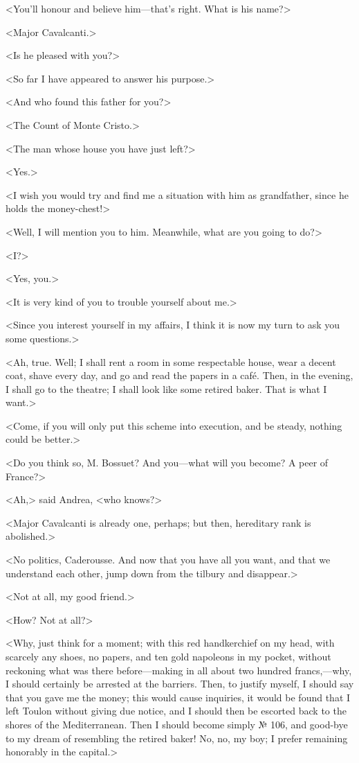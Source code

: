  <You'll honour and believe him—that's right. What is his name?> 

 <Major Cavalcanti.> 

 <Is he pleased with you?> 

 <So far I have appeared to answer his purpose.> 

 <And who found this father for you?> 

 <The Count of Monte Cristo.> 

 <The man whose house you have just left?> 

 <Yes.> 

 <I wish you would try and find me a situation with him as grandfather, since he holds the money-chest!> 

 <Well, I will mention you to him. Meanwhile, what are you going to do?> 

 <I?> 

 <Yes, you.> 

 <It is very kind of you to trouble yourself about me.> 

 <Since you interest yourself in my affairs, I think it is now my turn to ask you some questions.> 

 <Ah, true. Well; I shall rent a room in some respectable house, wear a decent coat, shave every day, and go and read the papers in a café. Then, in the evening, I shall go to the theatre; I shall look like some retired baker. That is what I want.> 

 <Come, if you will only put this scheme into execution, and be steady, nothing could be better.> 

 <Do you think so, M. Bossuet? And you—what will you become? A peer of France?> 

 <Ah,> said Andrea, <who knows?> 

 <Major Cavalcanti is already one, perhaps; but then, hereditary rank is abolished.> 

 <No politics, Caderousse. And now that you have all you want, and that we understand each other, jump down from the tilbury and disappear.> 

 <Not at all, my good friend.> 

 <How? Not at all?> 

 <Why, just think for a moment; with this red handkerchief on my head, with scarcely any shoes, no papers, and ten gold napoleons in my pocket, without reckoning what was there before—making in all about two hundred francs,—why, I should certainly be arrested at the barriers. Then, to justify myself, I should say that you gave me the money; this would cause inquiries, it would be found that I left Toulon without giving due notice, and I should then be escorted back to the shores of the Mediterranean. Then I should become simply № 106, and good-bye to my dream of resembling the retired baker! No, no, my boy; I prefer remaining honorably in the capital.> 

